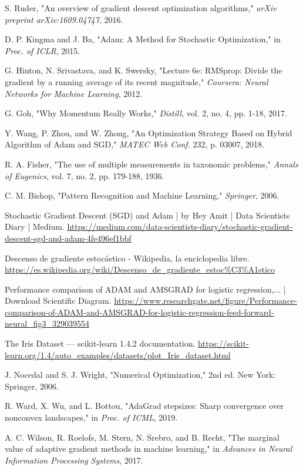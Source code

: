 \documentclass[12pt, spanish]{article}
\begin{document}
\begin{thebibliography}{99}
S. Ruder, "An overview of gradient descent optimization algorithms," \textit{arXiv preprint arXiv:1609.04747}, 2016.

D. P. Kingma and J. Ba, "Adam: A Method for Stochastic Optimization," in \textit{Proc. of ICLR}, 2015.

G. Hinton, N. Srivastava, and K. Swersky, "Lecture 6e: RMSprop: Divide the gradient by a running average of its recent magnitude," \textit{Coursera: Neural Networks for Machine Learning}, 2012.

G. Goh, "Why Momentum Really Works," \textit{Distill}, vol. 2, no. 4, pp. 1-18, 2017.

Y. Wang, P. Zhou, and W. Zhong, "An Optimization Strategy Based on Hybrid Algorithm of Adam and SGD," \textit{MATEC Web Conf.} 232, p. 03007, 2018.

R. A. Fisher, "The use of multiple measurements in taxonomic problems," \textit{Annals of Eugenics}, vol. 7, no. 2, pp. 179-188, 1936.

C. M. Bishop, "Pattern Recognition and Machine Learning," \textit{Springer}, 2006.

Stochastic Gradient Descent (SGD) and Adam | by Hey Amit | Data Scientists Diary | Medium. \url{https://medium.com/data-scientists-diary/stochastic-gradient-descent-sgd-and-adam-4fe496ef1bbf}

Descenso de gradiente estocástico - Wikipedia, la enciclopedia libre. \url{https://es.wikipedia.org/wiki/Descenso_de_gradiente_estoc\%C3\%A1stico}

Performance comparison of ADAM and AMSGRAD for logistic regression,... | Download Scientific Diagram. \url{https://www.researchgate.net/figure/Performance-comparison-of-ADAM-and-AMSGRAD-for-logistic-regression-feed-forward-neural_fig3_329039554}

The Iris Dataset — scikit-learn 1.4.2 documentation. \url{https://scikit-learn.org/1.4/auto_examples/datasets/plot_Iris_dataset.html}

J. Nocedal and S. J. Wright, "Numerical Optimization," 2nd ed. New York: Springer, 2006.

R. Ward, X. Wu, and L. Bottou, "AdaGrad stepsizes: Sharp convergence over nonconvex landscapes," in \textit{Proc. of ICML}, 2019.

A. C. Wilson, R. Roelofs, M. Stern, N. Srebro, and B. Recht, "The marginal value of adaptive gradient methods in machine learning," in \textit{Advances in Neural Information Processing Systems}, 2017.
\end{thebibliography}
\end{document}
